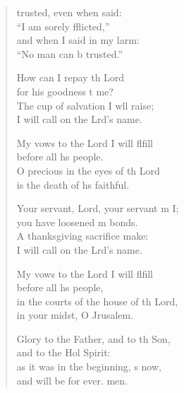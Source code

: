 \settowidth{\versewidth}{in the courts of the house of the Lord,  *}
\begin{verse}%
  \begin{patverse}
     trusted, even when  said: \Med\\
    “I am sorely fflicted,”\\
    and when I said in my larm: \Med\\
    “No man can b trusted.”
    
    How can I repay th Lord \Med\\
    for his goodness t me?\\
    The cup of salvation I w\pointup{\i}ll raise; \Med\\
    I will call on the Lrd’s name.
    
    My vows to the Lord I will flfill \Med\\
    before all h\pointup{\i}s people.\\
    O precious in the eyes of th Lord \Med\\
    is the death of h\pointup{\i}s faithful.

    Your servant, Lord, your servant m I; \Med\\
    you have loosened m bonds.\\
    A thanksgiving sacrifice  make: \Med\\
    I will call on the Lrd’s name.

    My vows to the Lord I will flfill \Med\\
    before all h\pointup{\i}s people,\\
    in the courts of the house of th Lord, \Med\\
    in your midst, O Jrusalem.

    Glory to the Father, and to th Son, \Med\\
    and to the Hol Spirit:\\
    as it was in the beginning, \pointup{\i}s now, \Med\\
    and will be for ever. men.
  \end{patverse}
\end{verse}
